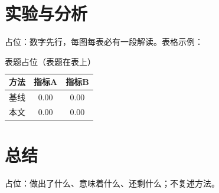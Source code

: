 \documentclass[UTF8,a4paper,12pt]{ctexart}
\begin{document}
\section{实验与分析}

占位：数字先行，每图每表必有一段解读。表格示例：
\begin{table}[!ht]
\centering
\caption{表题占位（表题在表上）}
\label{tab:example}
\begin{tabular}{lcc}
\toprule
方法 & 指标A & 指标B \\
\midrule
基线 & 0.00 & 0.00 \\
本文 & 0.00 & 0.00 \\
\bottomrule
\end{tabular}
\end{table}

\section{总结}

占位：做出了什么、意味着什么、还剩什么；不复述方法。



\end{document}
